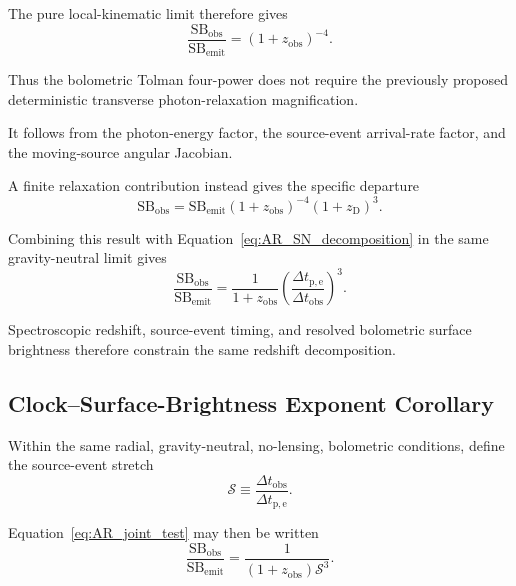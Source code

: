 The pure local-kinematic limit therefore gives
\begin{equation}
    \boxed{
    \frac{
        \mathrm{SB}_{\mathrm{obs}}
    }{
        \mathrm{SB}_{\mathrm{emit}}
    }
    =
    (1+z_{\mathrm{obs}})^{-4}.
    }
    \label{eq:AR_Tolman_rule}
\end{equation}

Thus the bolometric Tolman four-power does not require the previously proposed
deterministic transverse photon-relaxation magnification.

It follows from the photon-energy factor, the source-event arrival-rate factor,
and the moving-source angular Jacobian.

A finite relaxation contribution instead gives the specific departure
\begin{equation}
    \boxed{
    \mathrm{SB}_{\mathrm{obs}}
    =
    \mathrm{SB}_{\mathrm{emit}}
    (1+z_{\mathrm{obs}})^{-4}
    (1+z_{\mathrm D})^3.
    }
\end{equation}

Combining this result with
Equation~\eqref{eq:AR_SN_decomposition} in the same gravity-neutral limit gives
\begin{equation}
    \boxed{
    \frac{
        \mathrm{SB}_{\mathrm{obs}}
    }{
        \mathrm{SB}_{\mathrm{emit}}
    }
    =
    \frac{1}{
        1+z_{\mathrm{obs}}
    }
    \left(
        \frac{
            \Delta t_{\mathrm{p,e}}
        }{
            \Delta t_{\mathrm{obs}}
        }
    \right)^3.
    }
    \label{eq:AR_joint_test}
\end{equation}

Spectroscopic redshift, source-event timing, and resolved bolometric surface
brightness therefore constrain the same redshift decomposition.

\subsection{Clock--Surface-Brightness Exponent Corollary}
\label{subsec:AS_clock_brightness_corollary}

Within the same radial, gravity-neutral, no-lensing, bolometric conditions,
define the source-event stretch
\begin{equation}
    \mathcal S
    \equiv
    \frac{
        \Delta t_{\mathrm{obs}}
    }{
        \Delta t_{\mathrm{p,e}}
    }.
\end{equation}

Equation~\eqref{eq:AR_joint_test} may then be written
\begin{equation}
    \boxed{
    \frac{
        \mathrm{SB}_{\mathrm{obs}}
    }{
        \mathrm{SB}_{\mathrm{emit}}
    }
    =
    \frac{1}{
        (1+z_{\mathrm{obs}})
        \mathcal S^3
    }.
    }
    \label{eq:AS_clock_brightness_identity}
\end{equation}

